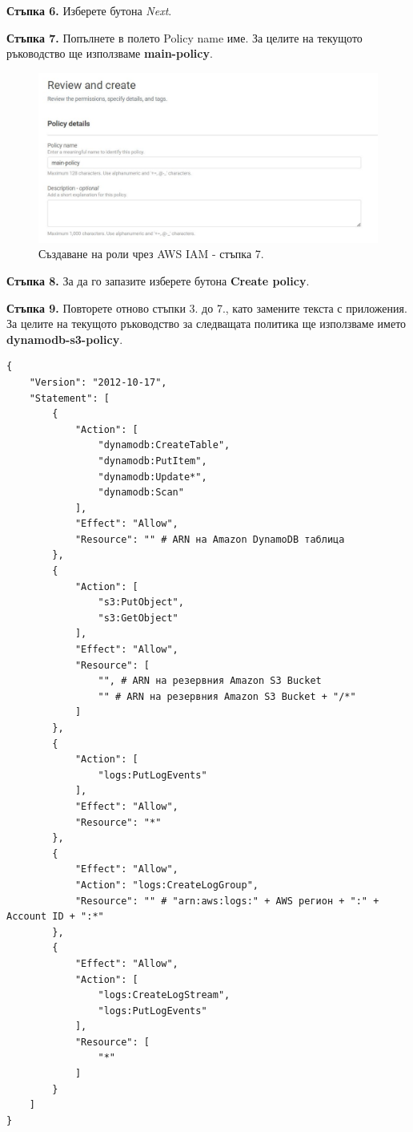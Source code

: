 \documentclass[12pt]{article}
\begin{document}
\noindent\textbf{Стъпка 6.} Изберете бутона \textit{Next}.

\noindent\textbf{Стъпка 7.} Попълнете в полето Policy name име. За целите на текущото ръководство ще използваме \textbf{main-policy}.

\begin{figure}[h!]
\centering
    \includegraphics[scale=0.6]{instructions/iam/7.JPG}
  \caption{Създаване на роли чрез AWS IAM - стъпка 7.}
\end{figure}

\noindent\textbf{Стъпка 8.} За да го запазите изберете бутона \textbf{Create policy}.

\noindent\textbf{Стъпка 9.} Повторете отново стъпки 3. до 7., като замените текста с приложения. За целите на текущото ръководство за следващата политика ще използваме името \textbf{dynamodb-s3-policy}.

\begin{verbatim}
{
    "Version": "2012-10-17",
    "Statement": [
        {
            "Action": [
                "dynamodb:CreateTable",
                "dynamodb:PutItem",
                "dynamodb:Update*",
                "dynamodb:Scan"
            ],
            "Effect": "Allow",
            "Resource": "" # ARN на Amazon DynamoDB таблица
        },
        {
            "Action": [
                "s3:PutObject",
                "s3:GetObject"
            ],
            "Effect": "Allow",
            "Resource": [
                "", # ARN на резервния Amazon S3 Bucket
                "" # ARN на резервния Amazon S3 Bucket + "/*"
            ]
        },
        {
            "Action": [
                "logs:PutLogEvents"
            ],
            "Effect": "Allow",
            "Resource": "*"
        },
        {
            "Effect": "Allow",
            "Action": "logs:CreateLogGroup",
            "Resource": "" # "arn:aws:logs:" + AWS регион + ":" + Account ID + ":*"
        },
        {
            "Effect": "Allow",
            "Action": [
                "logs:CreateLogStream",
                "logs:PutLogEvents"
            ],
            "Resource": [
                "*"
            ]
        }
    ]
}
\end{verbatim}
\end{document}
